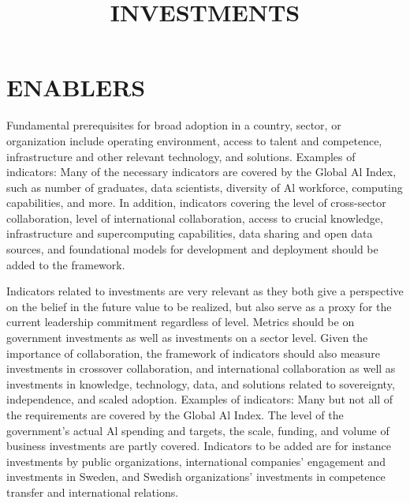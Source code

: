 \section*{ENABLERS}
Fundamental prerequisites for broad adoption in a country, sector, or organization include operating environment, access to talent and competence, infrastructure and other relevant technology, and solutions.
Examples of indicators:
Many of the necessary indicators are covered by the Global Al Index, such as number of graduates, data scientists, diversity of Al workforce, computing capabilities, and more.
In addition, indicators covering the level of cross-sector collaboration, level of international collaboration, access to crucial knowledge, infrastructure and supercomputing capabilities, data sharing and open data sources, and foundational models for development and deployment should be added to the framework.

\title{
INVESTMENTS
}
Indicators related to investments are very relevant as they both give a perspective on the belief in the future value to be realized, but also serve as a proxy for the current leadership commitment regardless of level. Metrics should be on government investments as well as investments on a sector level.
Given the importance of collaboration, the framework of indicators should also measure investments in crossover collaboration, and international collaboration as well as investments in knowledge, technology, data, and solutions related to sovereignty, independence, and scaled adoption.
Examples of indicators:
Many but not all of the requirements are covered by the Global Al Index. The level of the government's actual Al spending and targets, the scale, funding, and volume of business investments are partly covered. Indicators to be added are for instance investments by public organizations, international companies' engagement and investments in Sweden, and Swedish organizations' investments in competence transfer and international relations.
